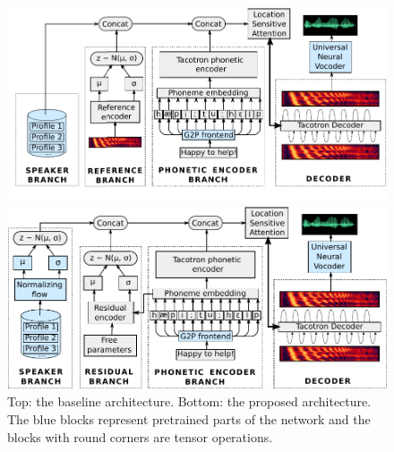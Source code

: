 \begin{figure}
	\centering

	\includegraphics[width=1.0\linewidth]{tts/images/baseline_architecture}

	\vspace{0.5cm}

	\includegraphics[width=1.0\linewidth]{tts/images/proposed_architecture}

	\caption{Top: the baseline architecture. Bottom: the proposed architecture. The blue blocks represent pretrained parts of the network and the blocks with round corners are tensor operations.}
	\label{fig:architectures}
\end{figure}



